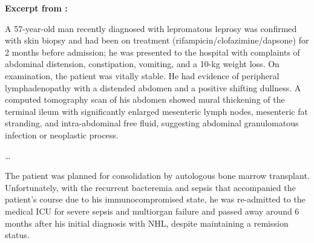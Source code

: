 \begin{ChSixUncaptionedFigure}
\begin{ChSixFloatBody}

\centering

\begin{tcolorbox}[
  enhanced,
  colback=gray!4,
  colframe=gray!35,
  boxrule=0.4pt,
  arc=2mm,
  left=3mm,right=3mm,top=2mm,bottom=2mm,
]

{\bfseries Excerpt from \cite{abu2023rare}:}


\begin{tcolorbox}[
  enhanced,
  colback=blue!3,
  colframe=blue!60!black,
  title=\textbf{PMC10629858},
  fonttitle=\small,
  boxrule=0.8pt,
  arc=2mm,
  left=3mm,right=3mm,top=2mm,bottom=2mm
]

\footnotesize

A 57-year-old man recently diagnosed with lepromatous leprosy was confirmed with skin biopsy and had been on treatment (rifampicin/clofazimine/dapsone) for 2 months before admission; he was presented to the hospital with complaints of abdominal distension, constipation, vomiting, and a 10-kg weight loss. On examination, the patient was vitally stable. He had evidence of peripheral lymphadenopathy with a distended abdomen and a positive shifting dullness. A computed tomography scan of his abdomen showed mural thickening of the terminal ileum with significantly enlarged mesenteric lymph nodes, mesenteric fat stranding, and intra-abdominal free fluid, suggesting abdominal granulomatous infection or neoplastic process.

\dots

The patient was planned for consolidation by autologous bone marrow transplant. Unfortunately, with the recurrent bacteremia and sepsis that accompanied the patient’s course due to his immunocompromised state, he was re-admitted to the medical ICU for severe sepsis and multiorgan failure and passed away around 6 months after his initial diagnosis with NHL, despite maintaining a remission status.

\end{tcolorbox}




\end{tcolorbox}
\end{ChSixFloatBody}
\end{ChSixUncaptionedFigure}
